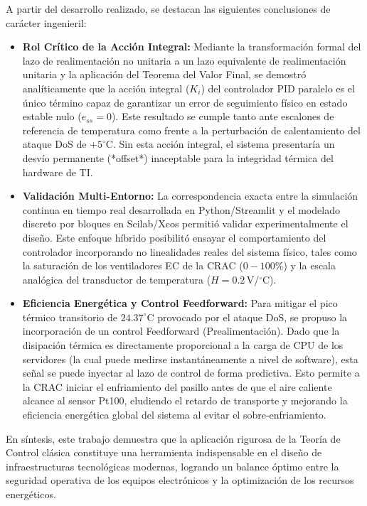 \documentclass[journal,twocolumn]{IEEEtran}
\begin{document}
A partir del desarrollo realizado, se destacan las siguientes conclusiones de carácter ingenieril:
\begin{itemize}
    \item \textbf{Rol Crítico de la Acción Integral:} Mediante la transformación formal del lazo de realimentación no unitaria a un lazo equivalente de realimentación unitaria y la aplicación del Teorema del Valor Final, se demostró analíticamente que la acción integral ($K_i$) del controlador PID paralelo es el único término capaz de garantizar un error de seguimiento físico en estado estable nulo ($e_{ss} = 0$). Este resultado se cumple tanto ante escalones de referencia de temperatura como frente a la perturbación de calentamiento del ataque DoS de $+5^\circ$C. Sin esta acción integral, el sistema presentaría un desvío permanente (*offset*) inaceptable para la integridad térmica del hardware de TI.
    \item \textbf{Validación Multi-Entorno:} La correspondencia exacta entre la simulación continua en tiempo real desarrollada en Python/Streamlit y el modelado discreto por bloques en Scilab/Xcos permitió validar experimentalmente el diseño. Este enfoque híbrido posibilitó ensayar el comportamiento del controlador incorporando no linealidades reales del sistema físico, tales como la saturación de los ventiladores EC de la CRAC ($0-100\%$) y la escala analógica del transductor de temperatura ($H = 0.2$\,V/$^\circ$C).
    \item \textbf{Eficiencia Energética y Control Feedforward:} Para mitigar el pico térmico transitorio de $24.37^\circ$C provocado por el ataque DoS, se propuso la incorporación de un control Feedforward (Prealimentación). Dado que la disipación térmica es directamente proporcional a la carga de CPU de los servidores (la cual puede medirse instantáneamente a nivel de software), esta señal se puede inyectar al lazo de control de forma predictiva. Esto permite a la CRAC iniciar el enfriamiento del pasillo antes de que el aire caliente alcance al sensor Pt100, eludiendo el retardo de transporte y mejorando la eficiencia energética global del sistema al evitar el sobre-enfriamiento.
\end{itemize}

En síntesis, este trabajo demuestra que la aplicación rigurosa de la Teoría de Control clásica constituye una herramienta indispensable en el diseño de infraestructuras tecnológicas modernas, logrando un balance óptimo entre la seguridad operativa de los equipos electrónicos y la optimización de los recursos energéticos.
\end{document}
